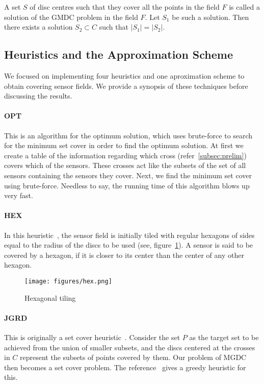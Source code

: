 A set $S$ of disc centres such that they cover all the points in the field $F$ is called a solution of the GMDC problem in the field $F$. Let $S_1$ be such a solution. Then there exists a solution $S_2 \subset C$ such that $|S_1|=|S_2|$.

\subsection{Heuristics and the Approximation Scheme}

We focused on implementing four heuristics and one aproximation scheme to
obtain covering sensor fields. We provide a synopsis of these techniques
before discussing the results.

\paragraph*{OPT} 
This is an algorithm for the optimum solution, which uses brute-force to search for the minimum set cover in order to find the optimum solution. At first we create a table of the information regarding which cross (refer~\ref{subsec:prelim}) covers which of the sensors. These crosses act like the subsets of the set of all sensors containing the sensors they cover. Next, we find the minimum set cover using brute-force. Needless to say, the running time of this algorithm blows up very fast.

\paragraph*{HEX} 
In this heuristic~\cite{hex}, the sensor field is initially tiled with regular hexagons of sides equal to the radius of the discs to be used (see, figure~\ref{fig:hex}). A sensor is said to be covered by a hexagon, if it is closer to its center than the center of any other hexagon.

\begin{figure}
\centering
\texttt{[image: figures/hex.png]}
\caption{Hexagonal tiling}\label{fig:hex}
\end{figure}

\paragraph*{JGRD} 
This is originally a set cover heuristic~\cite{jgreedy}. Consider the set $P$ as the target set to be achieved from the union of smaller subsets, and the discs centered at the crosses in $C$ represent the subsets of points covered by them. Our problem of MGDC then becomes a set cover problem. 
The reference~\cite{jgreedy} gives a greedy heuristic for this.


